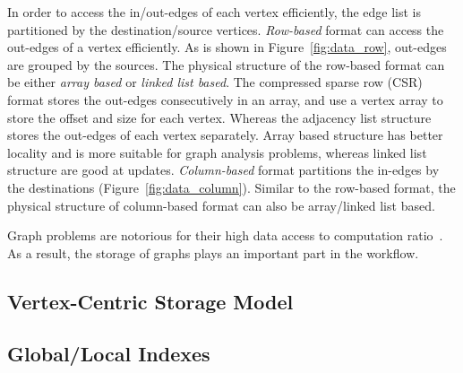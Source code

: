 In order to access the in/out-edges of each vertex efficiently, the edge list is partitioned by the destination/source vertices.
\emph{Row-based} format can access the out-edges of a vertex efficiently.
As is shown in Figure~\ref{fig:data_row}, out-edges are grouped by the sources.
The physical structure of the row-based format can be either \emph{array based} or \emph{linked list based}.
The compressed sparse row (CSR) format stores the out-edges consecutively in an array, and use a vertex array to store the offset and size for each vertex.
Whereas the adjacency list structure stores the out-edges of each vertex separately.
Array based structure has better locality and is more suitable for graph analysis problems, whereas linked list structure are good at updates.
\emph{Column-based} format partitions the in-edges by the destinations (Figure~\ref{fig:data_column}).
Similar to the row-based format, the physical structure of column-based format can also be array/linked list based.

Graph problems are notorious for their high data access to computation ratio~\cite{DBLP:journals/ppl/LumsdaineGHB07}.
As a result, the storage of graphs plays an important part in the workflow.

\subsection{Vertex-Centric Storage Model}

\subsection{Global/Local Indexes}
